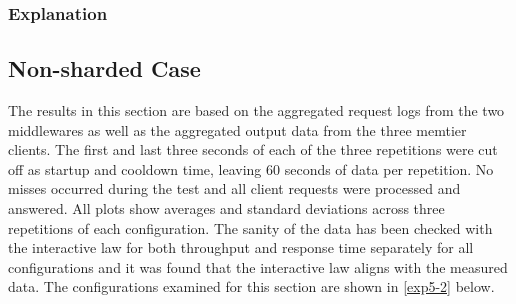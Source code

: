\documentclass[11pt,a4paper]{article}
\begin{document}
\subsubsection{Explanation}

\subsection{Non-sharded Case} \label{sec5.2}
The results in this section are based on the aggregated request logs from the two middlewares as well as the aggregated output data from the three memtier clients. The first and last three seconds of each of the three repetitions were cut off as startup and cooldown time, leaving 60 seconds of data per repetition. No misses occurred during the test and all client requests were processed and answered. All plots show averages and standard deviations across three repetitions of each configuration. The sanity of the data has been checked with the interactive law for both throughput and response time separately for all configurations and it was found that the interactive law aligns with the measured data. The configurations examined for this section are shown in \autoref{exp5-2} below.
\end{document}

